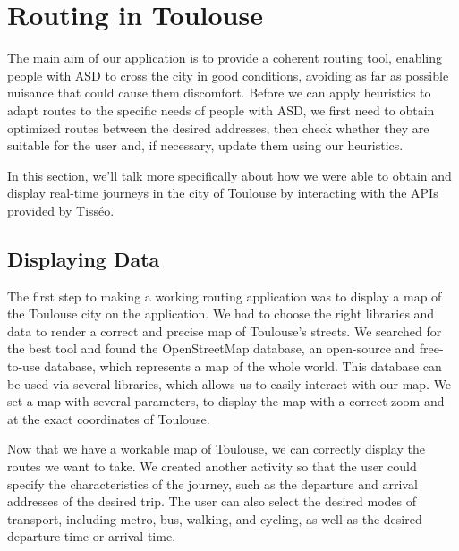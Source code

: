 \section{Routing in Toulouse}


The main aim of our application is to provide a coherent routing tool, enabling people with ASD to cross the city in good conditions, avoiding as far as possible nuisance that could cause them discomfort. Before we can apply heuristics to adapt routes to the specific needs of people with ASD, we first need to obtain optimized routes between the desired addresses, then check whether they are suitable for the user and, if necessary, update them using our heuristics.


In this section, we'll talk more specifically about how we were able to obtain and display real-time journeys in the city of Toulouse by interacting with the APIs provided by Tisséo.


\subsection{Displaying Data}


The first step to making a working routing application was to display a map of the Toulouse city on the application. We had to choose the right libraries and data to render a correct and precise map of Toulouse's streets. We searched for the best tool and found the OpenStreetMap database, an open-source and free-to-use database, which represents a map of the whole world. This database can be used via several libraries, which allows us to easily interact with our map. We set a map with several parameters, to display the map with a correct zoom and at the exact coordinates of Toulouse.


Now that we have a workable map of Toulouse, we can correctly display the routes we want to take. We created another activity so that the user could specify the characteristics of the journey, such as the departure and arrival addresses of the desired trip. The user can also select the desired modes of transport, including metro, bus, walking, and cycling, as well as the desired departure time or arrival time.


